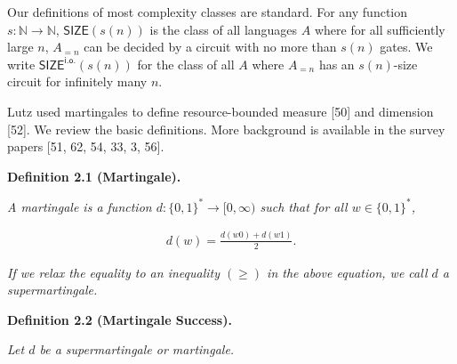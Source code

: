 Our definitions of most complexity classes are standard. For any function $s:\mathbb{N}\to\mathbb{N}$, $\mathsf{SIZE}\!(s(n))$ is the class of all
languages $A$ where for all sufficiently large $n$, $A_{=n}$ can be decided
by a circuit with no more than $s(n)$ gates. We write $\mathsf{SIZE}^{\mathsf{i.o.}}\!\!(s(n))$ for the class of all $A$ where $A_{=n}$ has an $s(n)$-size circuit for infinitely many $n$.\par




Lutz used martingales to define resource-bounded measure
[50] and dimension [52].
We review the basic definitions. More background is
available in the survey papers
[51, 62, 54, 33, 3, 56].\par





\par\medskip\noindent\textbf{
\textbf{Definition 2.1}\textbf{ }(Martingale)\textbf{.}
}\par



\emph{A martingale is a function $d:\{0,1\}^{*}\to[0,\infty)$ such
that for all $w\in\{0,1\}^{*}$,}\par


\[\begin{gathered}
d(w)=\frac{d(w0)+d(w1)}{2}.
\end{gathered}\]


\emph{If we relax the equality to an inequality $(\geq)$ in the above equation, we call
$d$ a supermartingale.}\par







\par\medskip\noindent\textbf{
\textbf{Definition 2.2}\textbf{ }(Martingale Success)\textbf{.}
}\par



\emph{Let $d$ be a supermartingale or martingale.}\par



